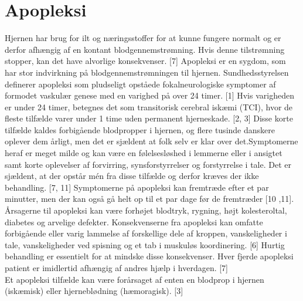 \section{Apopleksi}
Hjernen har brug for ilt og næringsstoffer for at kunne fungere normalt og er derfor afhængig af en kontant blodgennemstrømning. Hvis denne tilstrømning stopper, kan det have alvorlige konsekvenser. [7] Apopleksi er en sygdom, som har stor indvirkning på blodgennemstrømningen til hjernen. Sundhedsstyrelsen definerer apopleksi som pludseligt opståede fokalneurologiske symptomer af formodet vaskulær genese med en varighed på over 24 timer. [1] Hvis varigheden er under 24 timer, betegnes det som transitorisk cerebral iskæmi (TCI), hvor de fleste tilfælde varer under 1 time uden permanent hjerneskade. [2, 3] Disse korte tilfælde kaldes forbigående blodpropper i hjernen, og flere tusinde danskere oplever dem årligt, men det er sjældent at folk selv er klar over det.Symptomerne heraf er meget milde og kan være en følelsesløshed i lemmerne eller i ansigtet samt korte oplevelser af forvirring, synsforstyrrelser og forstyrrelse i tale. Det er sjældent, at der opstår mén fra disse tilfælde og derfor kræves der ikke behandling. [7, 11] 
Symptomerne på apopleksi kan fremtræde efter et par minutter, men der kan også gå helt op til et par dage før de fremtræder [10 ,11].
Årsagerne til apopleksi kan være forhøjet blodtryk, rygning, højt kolesteroltal, diabetes og arvelige defekter. Konsekvenserne fra apopleksi kan omfatte forbigående eller varig lammelse af forskellige dele af kroppen, %
vanskeligheder i tale, vanskeligheder ved spisning og et tab i muskuløs koordinering. [6] Hurtig behandling er essentielt for at mindske disse konsekvenser. Hver fjerde apopleksi patient er imidlertid afhængig af andres hjælp i hverdagen. [7] \\ %
Et apopleksi tilfælde kan være forårsaget af enten en blodprop i hjernen (iskæmisk) eller hjerneblødning (hæmoragisk). [3] 

